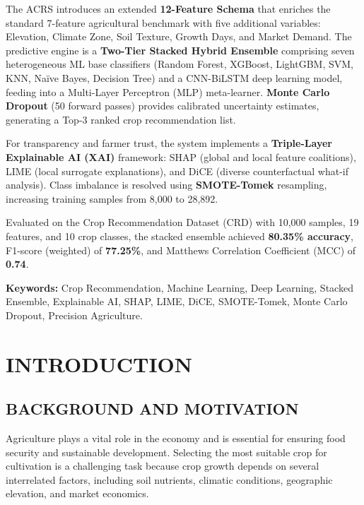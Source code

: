 \documentclass[12pt,a4paper,oneside]{report}
\begin{document}
The ACRS introduces an extended \textbf{12-Feature Schema} that enriches the standard 7-feature agricultural benchmark with five additional variables: Elevation, Climate Zone, Soil Texture, Growth Days, and Market Demand. The predictive engine is a \textbf{Two-Tier Stacked Hybrid Ensemble} comprising seven heterogeneous ML base classifiers (Random Forest, XGBoost, LightGBM, SVM, KNN, Na\"{i}ve Bayes, Decision Tree) and a CNN-BiLSTM deep learning model, feeding into a Multi-Layer Perceptron (MLP) meta-learner. \textbf{Monte Carlo Dropout} (50 forward passes) provides calibrated uncertainty estimates, generating a Top-3 ranked crop recommendation list.

For transparency and farmer trust, the system implements a \textbf{Triple-Layer Explainable AI (XAI)} framework: SHAP (global and local feature coalitions), LIME (local surrogate explanations), and DiCE (diverse counterfactual what-if analysis). Class imbalance is resolved using \textbf{SMOTE-Tomek} resampling, increasing training samples from 8,000 to 28,892.

Evaluated on the Crop Recommendation Dataset (CRD) with 10,000 samples, 19 features, and 10 crop classes, the stacked ensemble achieved \textbf{80.35\% accuracy}, F1-score (weighted) of \textbf{77.25\%}, and Matthews Correlation Coefficient (MCC) of \textbf{0.74}.

\vspace{0.4cm}
\noindent\textbf{Keywords:} Crop Recommendation, Machine Learning, Deep Learning, Stacked Ensemble, Explainable AI, SHAP, LIME, DiCE, SMOTE-Tomek, Monte Carlo Dropout, Precision Agriculture.
\newpage

\tableofcontents\newpage
\listoffigures\newpage
\listoftables\newpage

\setcounter{page}{1}

\chapter{INTRODUCTION}

\section{BACKGROUND AND MOTIVATION}

Agriculture plays a vital role in the economy and is essential for ensuring food security and sustainable development. Selecting the most suitable crop for cultivation is a challenging task because crop growth depends on several interrelated factors, including soil nutrients, climatic conditions, geographic elevation, and market economics.
\end{document}

